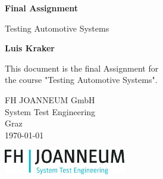 \begin{titlepage}
    \centering
    \vspace*{1cm}
    
    \Huge
    \textbf{Final Assignment}
    
    \vspace{0.5cm}
    \LARGE
    Testing Automotive Systems
    
    \vspace{1.5cm}
    
    \textbf{Luis Kraker}
    
    \vfill
    
   This document is the final Assignment for \\
    the course "Testing Automotive Systems". 
    
    \vspace{0.8cm}
    
    \Large
    FH JOANNEUM GmbH\\
    System Test Engineering\\
    Graz\\
    \today
    
    \vspace{2cm}
    
    \includegraphics[width=0.4\textwidth]{figures/logo_fhj_stm.jpg}
    
    \vspace{3cm}
\end{titlepage}
